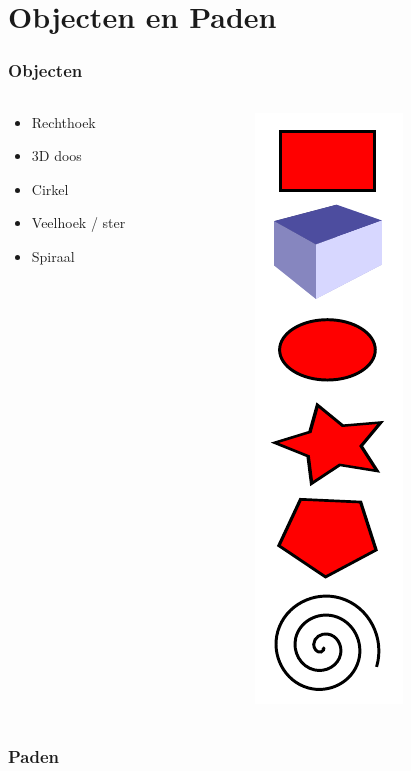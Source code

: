 \documentclass[t]{beamer}
\begin{document}
	\section{Objecten en Paden}
	\begin{frame}
		\frametitle{Objecten}
		\begin{columns}
			\begin{column}[T]{0.7\textwidth}
				\begin{itemize}
					\item Rechthoek
					\item 3D doos
					\item Cirkel
					\item Veelhoek / ster
					\item Spiraal
				\end{itemize}
			\end{column}
			\begin{column}[T]{0.2\textwidth}
				\includegraphics[height=0.8\textheight]{fig/objecten}\\
			\end{column}
		\end{columns}
	\end{frame}
	\begin{frame}
		\frametitle{Paden}
		
	\end{frame}
\end{document}
